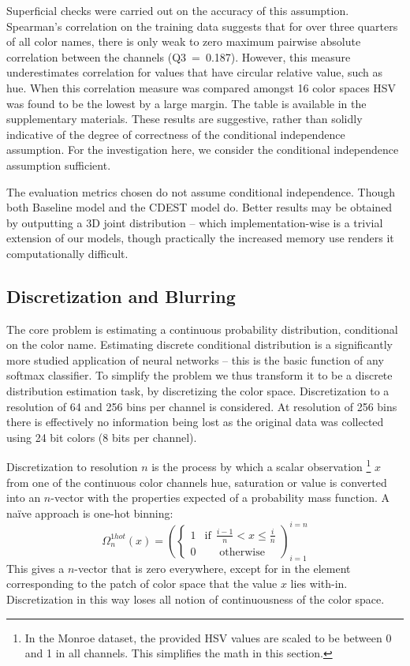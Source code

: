 \documentclass[11pt,letterpaper]{article}
\begin{document}
Superficial checks were carried out on the accuracy of this assumption.
Spearman's correlation on the training data suggests that for over three quarters of all color names, there is only weak to zero maximum pairwise absolute correlation between the channels (\mbox{Q3 = 0.187}).
However, this measure underestimates correlation for values that have circular relative value, such as hue.
When this correlation measure was compared amongst 16 color spaces HSV was found to be the lowest by a large margin.
The table is available in the supplementary materials.
These results are suggestive, rather than solidly indicative of the degree of correctness of the conditional independence assumption.
For the investigation here, we consider the conditional independence assumption sufficient.

The evaluation metrics chosen do not assume conditional independence.
Though both Baseline model and the CDEST model do.
Better results may be obtained by outputting a 3D joint distribution -- which implementation-wise is a trivial extension of our models, 
though practically the increased memory use renders it computationally difficult.


\subsection{Discretization and Blurring}
The core problem is estimating a continuous  probability distribution, conditional on the color name.
Estimating discrete conditional distribution is a significantly more studied application of neural networks
-- this is the basic function of any softmax classifier.
To simplify the problem we thus transform it to be a discrete distribution estimation task, by discretizing the color space.
Discretization to a resolution of 64 and 256 bins per channel is considered.
At resolution of 256 bins there is effectively no information being lost as the original data was collected using 24 bit colors (8 bits per channel).

Discretization to resolution $n$ is the process by which a scalar observation%
\footnote{In the Monroe dataset, the provided HSV values are scaled to be between 0 and 1 in all channels. This simplifies the math in this section.}
 $x$
from one of the continuous color channels hue, saturation or value is converted into an $n$-vector with the properties expected of a probability mass function.
A na{\"i}ve approach is one-hot binning:
\[\Omega_{n}^{1hot}(x)=\left(\begin{cases}
1 & \mathrm{if}\:\:\frac{i-1}{n}<x\le\frac{i}{n}\\
0 & \:\:\:\:\:\:\mathrm{otherwise}
\end{cases}\right)_{i=1}^{i=n}
\]
This gives a $n$-vector that is zero everywhere, except for in the element corresponding to the patch of color space that the value $x$ lies with-in.
Discretization in this way loses all notion of continuousness of the color space.
\end{document}
